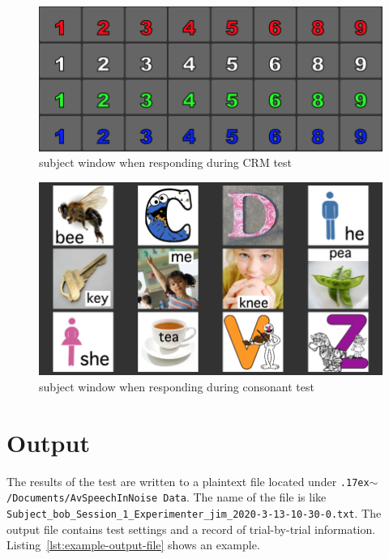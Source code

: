 \documentclass[11pt,pdftex,letterpaper]{article}
\newcommand{\mytilde}{\raise.17ex\hbox{$\scriptstyle\mathtt{\sim}$}}
\begin{document}
\begin{figure}
\centering
\includegraphics[width = 0.9\linewidth]{coordinate-response-window.png}
\caption{subject window when responding during CRM test}
\label{fig:coordinate-response-window}
\end{figure}

\begin{figure}
\centering
\includegraphics[width = 0.9\linewidth]{consonant-response-window.png}
\caption{subject window when responding during consonant test}
\label{fig:consonant-response-window}
\end{figure}

\section{Output}
The results of the test are written to a plaintext file located under \texttt{\mytilde/Documents/AvSpeechInNoise Data}. The name of the file is like \texttt{Subject\_bob\_Session\_1\_Experimenter\_jim\_2020-3-13-10-30-0.txt}. The output file contains test settings and a record of trial-by-trial information. Listing~\ref{lst:example-output-file} shows an example.

\noindent\begin{minipage}{\textwidth}

\end{minipage}
\end{document}
